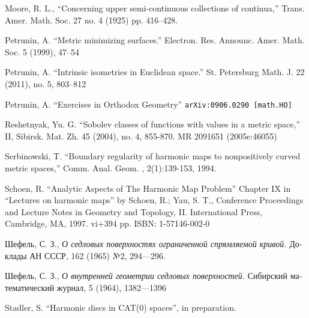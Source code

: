 \documentclass{article}
\begin{document}
\begin{thebibliography}{52}
Moore, R. L.,
``Concerning upper semi-continuous collections of continua,''
Trans. Amer. Math. Soc. 27 no. 4 (1925) pp. 416--428.

 Petrunin, A.
``Metric minimizing surfaces.''
Electron. Res. Announc. Amer. Math. Soc. 5 (1999), 47--54 

 Petrunin, A.
``Intrinsic isometries in Euclidean space.''
St. Petersburg Math. J. 22 (2011), no. 5, 803--812 

 Petrunin, A. 
``Exercises in Orthodox Geometry''
{\tt arXiv:0906.0290 [math.HO]}

Reshetnyak, Yu. G. ``Sobolev classes of functions with values in a metric space,'' II, Sibirsk. Mat. Zh. 45 (2004), no. 4, 855-870. MR 2091651 (2005e:46055)

 Serbinowski,  T. ``Boundary regularity of harmonic maps to nonpositively curved metric spaces,''
Comm. Anal. Geom. , 2(1):139-153, 1994.

Schoen, R. ``Analytic Aspects of The Harmonic Map Problem'' Chapter IX in  
``Lectures on harmonic maps'' by Schoen, R.; Yau, S. T.,  
Conference Proceedings and Lecture Notes in Geometry and Topology, II. International Press, Cambridge, MA, 1997. vi+394 pp. ISBN: 1-57146-002-0

\begin{otherlanguage}{russian}
Шефель, С. З.,
\textit{О седловых поверхностях ограниченной спрямляемой кривой.}
Доклады АН СССР, 162 (1965) №2, 
294---296.
\end{otherlanguage}

\begin{otherlanguage}{russian}
Шефель, С. З., 
\textit{О внутренней геометрии седловых поверхностей.}
Сибирский математический журнал, 5 (1964), 1382---1396
\end{otherlanguage}

 Stadler, S. ``Harmonic discs in CAT(0) spaces'', in preparation.



\end{thebibliography}
\end{document}

